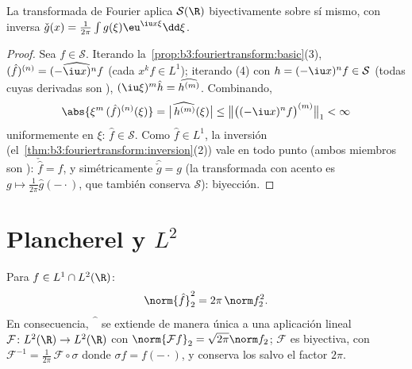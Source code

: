 \begin{theorem}\label{thm:b3:fouriertransform:schwartz}
La transformada de Fourier aplica $\mathcal S(\R)$ biyectivamente sobre
sí mismo, con inversa $\check g(x) = \frac1{2\pi}\int
g(\xi)\eu^{\iu x\xi}\dd\xi$.
\end{theorem}

\begin{proof}
Sea $f \in \mathcal S$. Iterando
la~\cref{prop:b3:fouriertransform:basic}(3), $(\hat f)^{(n)} =
\widehat{(-\iu x)^nf}$ (cada $x^kf \in L^1$); iterando (4) con
$h = (-\iu x)^nf \in \mathcal S$ (todas cuyas derivadas son
), $(\iu\xi)^m\hat h =
\widehat{h^{(m)}}$. Combinando,
\[
\abs{\xi^m\,(\hat f)^{(n)}(\xi)}
= \bigl|\widehat{\,h^{(m)}}(\xi)\bigr|
\leq \bigl\|\bigl((-\iu x)^nf\bigr)^{(m)}\bigr\|_1 < \infty
\]
uniformemente en $\xi$: $\hat f \in \mathcal S$. Como $\hat f \in L^1$,
la inversión (el~\cref{thm:b3:fouriertransform:inversion}(2)) vale en
todo punto (ambos miembros son
): $\check{\hat f} = f$, y
simétricamente $\widehat{\check g} = g$ (la transformada con acento es
$g \mapsto \frac1{2\pi}\hat g(-\cdot)$, que también conserva
$\mathcal S$): biyección.
\end{proof}

\section{Plancherel y \texorpdfstring{$L^2$}{L2}}

\begin{theorem}[Plancherel]\label{thm:b3:fouriertransform:plancherel}
Para $f \in L^1 \cap L^2(\R)$:
\[
\norm{\hat f}_2^2 = 2\pi\,\norm f_2^2 .
\]
En consecuencia, $\widehat{\phantom f}$ se extiende de manera única a
una aplicación lineal 
$\mathcal F \colon L^2(\R) \to L^2(\R)$ con
$\norm{\mathcal Ff}_2 = \sqrt{2\pi}\norm f_2$; $\mathcal
F$ es biyectiva, con $\mathcal F^{-1} =
\frac1{2\pi}\,\mathcal F\circ\sigma$ donde $\sigma f =
f(-\cdot)$, y conserva los  salvo el factor
$2\pi$.
\end{theorem}

